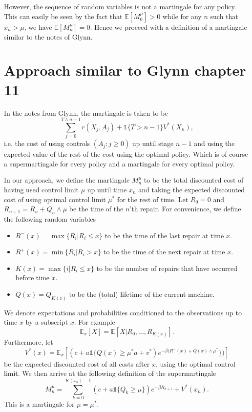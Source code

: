 However, the sequence of random variables is not a martingale for any policy.
This can easily be seen by the fact that $\mathbb{E}[M_0^\mu]>0$ while for any $n$ such that $x_n>\mu$, we have $\mathbb{E}[M_n^\mu]=0$.
Hence we proceed with a definition of a martingale similar to the notes of Glynn.
\section{Approach similar to Glynn chapter 11}
In the notes from Glynn, the martingale is taken to be
\begin{equation}
\sum\limits_{j=0}^{T\wedge n-1} r(X_j,A_j) +\mathds{1}\{T>n-1\}V^*(X_n),
\end{equation}
i.e. the cost of using controls $(A_j: j\geq 0)$ up until stage $n-1$ and using the expected value of the rest of the cost using the optimal policy.
Which is of course a supermartingale for every policy and a martingale for every optimal policy.

In our approach, we define the martingale $M_n^\mu$ to be the total discounted cost of having used control limit $\mu$ up until time $x_n$ and taking the expected discounted cost of using optimal control limit $\mu^*$ for the rest of time.
Let $R_0=0$ and $R_{n+1}=R_n+Q_n\wedge \mu$ be the time of the $n$'th repair.
For convenience, we define the following random variables
\begin{itemize}
\item $R^-(x)=\max\{R_i|R_i\leq x\}$ to be the time of the last repair at time $x$.
\item $R^+(x)=\min\{R_i|R_i> x\}$ to be the time of the next repair at time $x$.
\item $K(x)=\max\{i|R_i\leq x\}$ to be the number of repairs that have occurred before time $x$.
\item $Q(x)=Q_{K(x)}$ to be the (total) lifetime of the current machine.
\end{itemize}
We denote expectations and probabilities conditioned to the observations up to time $x$ by a subscript $x$.
For example
$$
\mathbb{E}_x[X]=\mathbb{E}[X|R_0,...,R_{K(x)}].
$$
Furthermore, let 
$$V^*(x)=\mathbb{E}_x[(c+a\mathds{1}\{Q(x)\geq \mu^*a+v^*)e^{-\beta(R^-(x)+Q(x)\wedge\mu^*}\})]$$
be the expected discounted cost of all costs after $x$, using the optimal control limit.
We then arrive at the following definition of the supermartingale
\begin{equation}\label{eq:martingaleDef}
M_n^\mu=\sum\limits_{k=0}^{K(x_n)-1}(c+a\mathds{1}\{Q_k\geq\mu\})e^{-\beta R_{k+1}} + V^*(x_n).
\end{equation}
This is a martingale for $\mu=\mu^*$.

